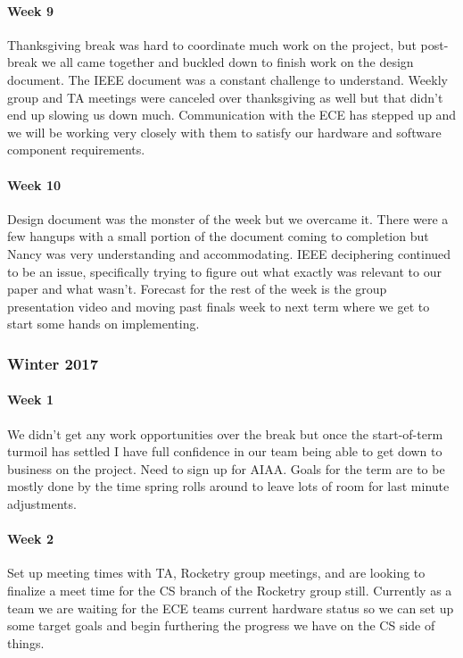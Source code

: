 \documentclass[10pt,draftclsnofoot,onecolumn,retainorgcmds]{IEEEtran}
\begin{document}
\paragraph{Week 9}
Thanksgiving break was hard to coordinate much work on the project, but post-break we all came together and buckled down to finish work on the design document. The IEEE document was a constant challenge to understand. Weekly group and TA meetings were canceled over thanksgiving as well but that didn't end up slowing us down much. Communication with the ECE has stepped up and we will be working very closely with them to satisfy our hardware and software component requirements.\\
\paragraph{Week 10}
Design document was the monster of the week but we overcame it. There were a few hangups with a small portion of the document coming to completion but Nancy was very understanding and accommodating. IEEE deciphering continued to be an issue, specifically trying to figure out what exactly was relevant to our paper and what wasn't. Forecast for the rest of the week is the group presentation video and moving past finals week to next term where we get to start some hands on implementing.\\
\subsubsection{Winter 2017}
\paragraph{Week 1}
 We didn't get any work opportunities over the break but once the start-of-term turmoil has settled I have full confidence in our team being able to get down to business on the project. Need to sign up for AIAA. Goals for the term are to be mostly done by the time spring rolls around to leave lots of room for last minute adjustments.\\
\paragraph{Week 2}
Set up meeting times with TA, Rocketry group meetings, and are looking to finalize a meet time for the CS branch of the Rocketry group still. Currently as a team we are waiting for the ECE teams current hardware status so we can set up some target goals and begin furthering the progress we have on the CS side of things.\\
\end{document}

